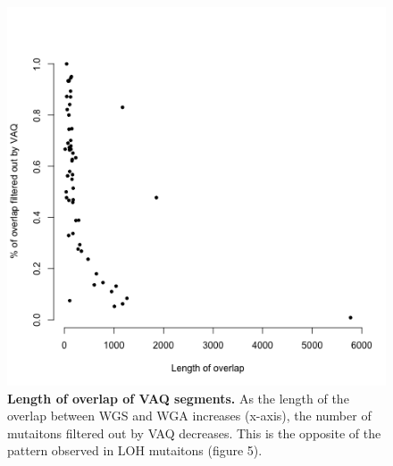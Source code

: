 \documentclass[11pt]{article} %
\begin{document}
\begin{figure}
\includegraphics[scale=1.0]{./LOH_VAQ/VAQ_all.png}
\caption{ \textbf{Length of overlap of VAQ segments.} As the length of the overlap between WGS and WGA increases (x-axis), the number of mutaitons filtered out by VAQ decreases. This is the opposite of the pattern observed in LOH mutaitons (figure 5).}
\end{figure}



\end{document}
